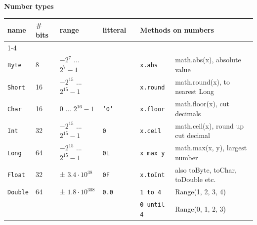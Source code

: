 \documentclass[article, a5paper]{memoir}
\renewcommand{\arraystretch}{0.9}
\newcommand{\code}{\lstinline[basicstyle=\ttfamily]}
\begin{document}
{\small \renewcommand{\arraystretch}{1.1}
\textbf{Number types}\\
\begin{tabular}{@{}l l l l p{2mm} | l l}
\textbf{name} & \textbf{\# bits} & \textbf{range} & \textbf{litteral} &   & \multicolumn{2}{l}{\textbf{Methods on numbers}}\\ \cline{1-4}%
& & & &\\[-1em]
\texttt{Byte}   &  8  & $-2^7$ ... $2^7-1$  & &  
& \code|x.abs| & math.abs(x), absolute value\\

\texttt{Short}  &  16 & $-2^{15}$ ... $2^{15}-1$ &   &  
& \code|x.round| & math.round(x), to nearest Long\\

\texttt{Char}   &  16 & $0$ ... $2^{16}-1$ & \texttt{'0'} &  
& \code|x.floor| & math.floor(x), cut decimals\\

\texttt{Int}    &  32 & $-2^{15}$ ... $2^{15}-1$ & \texttt{0} & 
& \code|x.ceil| & math.ceil(x), round up cut decimal\\

\texttt{Long}   &  64 & $-2^{15}$ ... $2^{15}-1$ & \texttt{0L} & 
& \code|x max y| & math.max(x, y), largest number\\

\texttt{Float}  &  32 & ± $3.4 \cdot 10^{38}$  & \texttt{0F} &
& \code|x.toInt| & also toByte, toChar, toDouble etc.\\

\texttt{Double} &  64 & ± $1.8 \cdot 10^{308}$ & \texttt{0.0} & 
& \code|1 to 4| & Range(1, 2, 3, 4) \\
 & & & & 
 & \code|0 until 4| & Range(0, 1, 2, 3) \\
\end{tabular}
}
\end{document}
